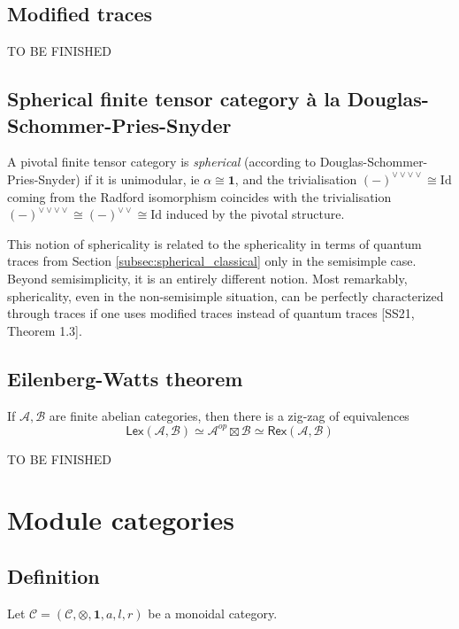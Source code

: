 \documentclass[11pt]{article}
\newcommand{\cat}[1]{\mathcal{#1}}
\theoremstyle{definition}
\begin{document}
\subsection{Modified traces}

{\color{red} TO BE FINISHED }




\subsection{Spherical finite tensor category à la Douglas-Schommer-Pries-Snyder}

A pivotal finite tensor category is \textit{spherical} (according to Douglas-Schommer-Pries-Snyder) if it is unimodular, ie $\alpha \cong \mathbf{1}$, and the trivialisation $(-)^{\vee \vee \vee \vee} \cong \mathrm{Id}$ coming from the Radford isomorphism coincides with the   trivialisation $(-)^{\vee \vee \vee \vee} \cong (-)^{ \vee \vee} \cong  \mathrm{Id}$ induced by the pivotal structure.


This notion of sphericality is related to the sphericality in terms of quantum traces from Section \ref{subsec:spherical_classical} only in the semisimple case. Beyond semisimplicity, it is an entirely different notion. Most remarkably, sphericality, even in the non-semisimple situation, can be perfectly characterized through traces if one uses modified traces instead of quantum traces [SS21, Theorem 1.3].



\subsection{Eilenberg-Watts theorem}


If $\mathcal{A}, \cat{B}$ are finite abelian categories, then there is a zig-zag of equivalences
$$  \mathsf{Lex}(\mathcal{A}, \cat{B}) \simeq \mathcal{A}^{op} \boxtimes \cat{B}   \simeq  \mathsf{Rex}(\mathcal{A}, \cat{B}) $$

{\color{red} TO BE FINISHED}


\section{ Module categories}

\subsection{ Definition}
Let \( \mathcal{C} = (\mathcal{C}, \otimes, \mathbf{1}, a, l, r) \) be a monoidal category.
\end{document}
